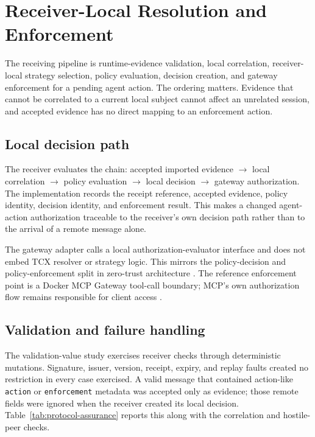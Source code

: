 \section{Receiver-Local Resolution and Enforcement}

The receiving pipeline is runtime-evidence validation, local correlation, receiver-local strategy selection, policy evaluation, decision creation, and gateway enforcement for a pending agent action. The ordering matters. Evidence that cannot be correlated to a current local subject cannot affect an unrelated session, and accepted evidence has no direct mapping to an enforcement action.

\subsection{Local decision path}

The receiver evaluates the chain: accepted imported evidence $\rightarrow$ local correlation $\rightarrow$ policy evaluation $\rightarrow$ local decision $\rightarrow$ gateway authorization. The implementation records the receipt reference, accepted evidence, policy identity, decision identity, and enforcement result. This makes a changed agent-action authorization traceable to the receiver's own decision path rather than to the arrival of a remote message alone.

The gateway adapter calls a local authorization-evaluator interface and does not embed TCX resolver or strategy logic. This mirrors the policy-decision and policy-enforcement split in zero-trust architecture \cite{nistZta}. The reference enforcement point is a Docker MCP Gateway tool-call boundary; MCP's own authorization flow remains responsible for client access \cite{mcpAuthorization}.

\subsection{Validation and failure handling}

The validation-value study exercises receiver checks through \ValidatorMutationCases{} deterministic mutations. Signature, issuer, version, receipt, expiry, and replay faults created no restriction in every case exercised. A valid message that contained action-like \texttt{action} or \texttt{enforcement} metadata was accepted only as evidence; those remote fields were ignored when the receiver created its local decision. Table~\ref{tab:protocol-assurance} reports this along with the correlation and hostile-peer checks.

